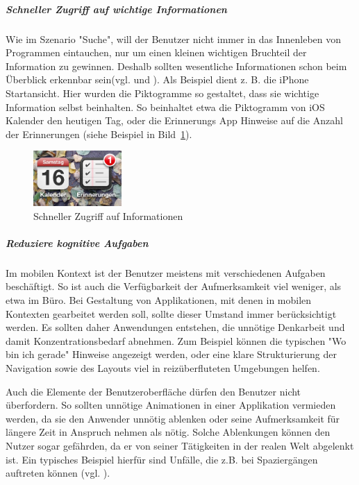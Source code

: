 \subparagraph{Schneller Zugriff auf wichtige Informationen} 
\label{subp:subparagraph_name}

Wie im Szenario "Suche", will der Benutzer nicht immer in das Innenleben von Programmen eintauchen, nur um einen kleinen wichtigen Bruchteil der Information zu gewinnen. Deshalb sollten wesentliche Informationen schon beim Überblick erkennbar sein(vgl. \cite[Seite 54]{mobileFrontier} und \cite{Neil:2012uf}). Als Beispiel dient z. B. die iPhone Startansicht. Hier wurden die Piktogramme so gestaltet, dass sie wichtige Information selbst beinhalten. So beinhaltet etwa die Piktogramm von iOS Kalender den heutigen Tag, oder die Erinnerungs App Hinweise auf die Anzahl der Erinnerungen (siehe Beispiel in Bild~\ref{fig:iconIos}).

\begin{figure}[b]
	\begin{center}
	
	\includegraphics[width=0.3\textwidth]{img/iconIos.png}
	\caption{Schneller Zugriff auf Informationen}\label{fig:iconIos}
\end{center}
\end{figure}

\subparagraph{Reduziere kognitive Aufgaben} 
\label{subp:reduziere_kognitive_aufgaben_}

Im mobilen Kontext ist der Benutzer meistens mit verschiedenen Aufgaben beschäftigt. So ist auch die Verfügbarkeit der Aufmerksamkeit viel weniger, als etwa im Büro. Bei Gestaltung von Applikationen, mit denen in mobilen Kontexten gearbeitet werden soll, sollte dieser Umstand immer berücksichtigt werden. Es sollten daher Anwendungen entstehen, die unnötige Denkarbeit und damit Konzentrationsbedarf abnehmen. Zum Beispiel können die typischen "Wo bin ich gerade" Hinweise angezeigt werden, oder eine klare Strukturierung der Navigation sowie des Layouts viel in reizüberfluteten Umgebungen helfen. 

Auch die Elemente der Benutzeroberfläche dürfen den Benutzer nicht überfordern. So sollten unnötige Animationen in einer Applikation vermieden werden, da sie den Anwender unnötig ablenken oder seine Aufmerksamkeit für längere Zeit in Anspruch nehmen als nötig. Solche Ablenkungen können den Nutzer sogar gefährden, da er von seiner Tätigkeiten in der realen Welt abgelenkt ist. Ein typisches Beispiel hierfür sind Unfälle, die z.B. bei Spaziergängen auftreten können (vgl. \cite{Nasar:2008cc}).


